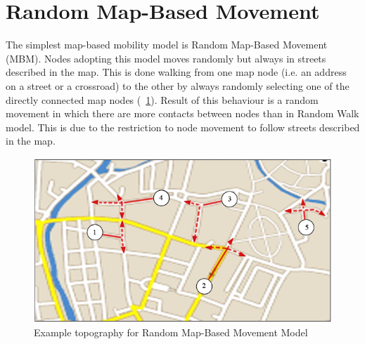 \section{Random Map-Based Movement}
The simplest map-based mobility model is Random Map-Based Movement (MBM). Nodes adopting this model moves randomly but always in streets described in the map. This is done walking from one map node (i.e. an address on a street or a crossroad) to the other by always randomly selecting one of the directly connected map nodes (\figurename~\ref{fig:random_map}). Result of this behaviour is a random movement in which there are more contacts between nodes than in Random Walk model. This is due to the restriction to node movement to follow streets described in the map.
\begin{figure}[htpb]
  \begin{center}
    \includegraphics[scale=0.6]{4-movimento/img/random_map.png}
    \caption{Example topography for Random Map-Based Movement Model}    
    \label{fig:random_map}
  \end{center}
\end{figure}

